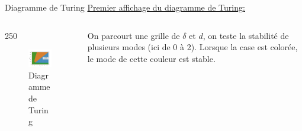 \documentclass{beamer}
\begin{document}
\begin{frame}{Diagramme de Turing}
    \underline{Premier affichage du diagramme de Turing:}
    
    \begin{columns}

    \begin{column}{250}
    \begin{figure}
    \includegraphics[width=220]{diagrammes_turing3_1.png}
    \caption{\label{diagramme_turing_1}{Diagramme de Turing}}
    \end{figure}
    \end{column}
    
    \begin{column}{2.7cm}
    On parcourt une grille de $\delta$ et $d$, on teste la stabilité de plusieurs modes (ici de 0 à 2). Lorsque la case est colorée, le mode de cette couleur est stable.
    
    \end{column}
    \end{columns}
    
    
\end{frame}
\end{document}
